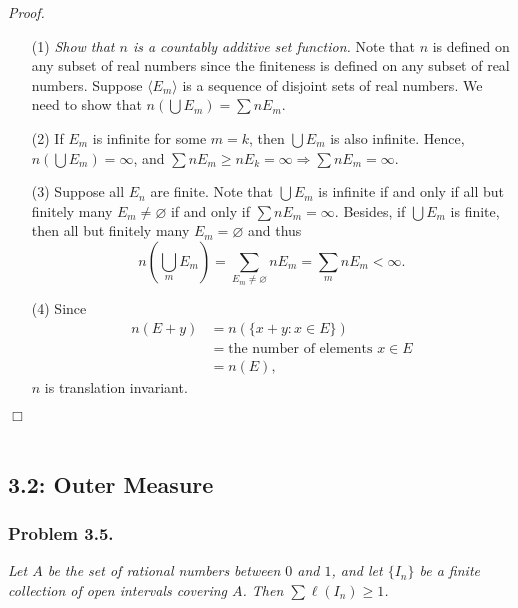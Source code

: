 \documentclass{article}
\begin{document}
\emph{Proof.}
\begin{enumerate}
\item[(1)]
  \emph{Show that $n$ is a countably additive set function.}
  Note that $n$ is defined on any subset of real numbers
  since the finiteness is defined on any subset of real numbers.
  Suppose $\langle E_m \rangle$ is a sequence of disjoint sets of real numbers.
  We need to show that $n\left( \bigcup E_m \right) = \sum n E_m$.

\item[(2)]
  If $E_m$ is infinite for some $m = k$, then $\bigcup E_m$ is also infinite.
  Hence, $n \left( \bigcup E_m \right) = \infty$,
  and $\sum n E_m \geq n E_k = \infty \Longrightarrow \sum n E_m = \infty$.

\item[(3)]
  Suppose all $E_n$ are finite.
  Note that
  $\bigcup E_m$ is infinite if and only if all but finitely many $E_m \neq \varnothing$
  if and only if $\sum n E_m = \infty$.
  Besides, if $\bigcup E_m$ is finite, then all but finitely many $E_m = \varnothing$
  and thus
  \[
    n\left( \bigcup_m E_m \right)
    = \sum_{E_m \neq \varnothing} n E_m
    = \sum_{m} n E_m
    < \infty.
  \]

\item[(4)]
  Since
  \begin{align*}
    n(E+y)
    &= n(\{ x + y : x \in E\}) \\
    &= \text{the number of elements $x \in E$} \\
    &= n(E),
  \end{align*}
  $n$ is translation invariant.
\end{enumerate}
$\Box$ \\\\






\subsection*{3.2: Outer Measure \\}



\subsubsection*{Problem 3.5.}
\emph{Let $A$ be the set of rational numbers between $0$ and $1$, and
let $\{ I_n \}$ be a finite collection of open intervals covering $A$.
Then $\sum \ell(I_n) \geq 1$.} \\
\end{document}
